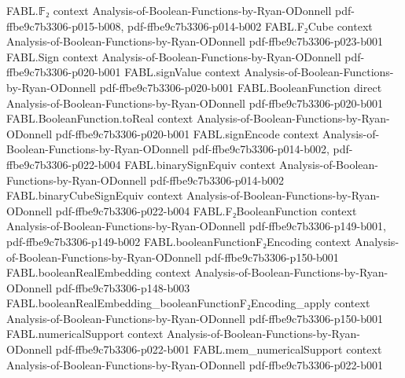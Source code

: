 \begin{theorem}
\leanok
{}
\proofstep
  {FABL.𝔽₂}
  {context}
  {Analysis-of-Boolean-Functions-by-Ryan-ODonnell}
  {pdf-ffbe9c7b3306-p015-b008,
    pdf-ffbe9c7b3306-p014-b002}
\proofstep
  {FABL.F₂Cube}
  {context}
  {Analysis-of-Boolean-Functions-by-Ryan-ODonnell}
  {pdf-ffbe9c7b3306-p023-b001}
\proofstep
  {FABL.Sign}
  {context}
  {Analysis-of-Boolean-Functions-by-Ryan-ODonnell}
  {pdf-ffbe9c7b3306-p020-b001}
\proofstep
  {FABL.signValue}
  {context}
  {Analysis-of-Boolean-Functions-by-Ryan-ODonnell}
  {pdf-ffbe9c7b3306-p020-b001}
\proofstep
  {FABL.BooleanFunction}
  {direct}
  {Analysis-of-Boolean-Functions-by-Ryan-ODonnell}
  {pdf-ffbe9c7b3306-p020-b001}
\proofstep
  {FABL.BooleanFunction.toReal}
  {context}
  {Analysis-of-Boolean-Functions-by-Ryan-ODonnell}
  {pdf-ffbe9c7b3306-p020-b001}
\proofstep
  {FABL.signEncode}
  {context}
  {Analysis-of-Boolean-Functions-by-Ryan-ODonnell}
  {pdf-ffbe9c7b3306-p014-b002,
    pdf-ffbe9c7b3306-p022-b004}
\proofstep
  {FABL.binarySignEquiv}
  {context}
  {Analysis-of-Boolean-Functions-by-Ryan-ODonnell}
  {pdf-ffbe9c7b3306-p014-b002}
\proofstep
  {FABL.binaryCubeSignEquiv}
  {context}
  {Analysis-of-Boolean-Functions-by-Ryan-ODonnell}
  {pdf-ffbe9c7b3306-p022-b004}
\proofstep
  {FABL.F₂BooleanFunction}
  {context}
  {Analysis-of-Boolean-Functions-by-Ryan-ODonnell}
  {pdf-ffbe9c7b3306-p149-b001,
    pdf-ffbe9c7b3306-p149-b002}
\proofstep
  {FABL.booleanFunctionF₂Encoding}
  {context}
  {Analysis-of-Boolean-Functions-by-Ryan-ODonnell}
  {pdf-ffbe9c7b3306-p150-b001}
\proofstep
  {FABL.booleanRealEmbedding}
  {context}
  {Analysis-of-Boolean-Functions-by-Ryan-ODonnell}
  {pdf-ffbe9c7b3306-p148-b003}
\proofstep
  {FABL.booleanRealEmbedding_booleanFunctionF₂Encoding_apply}
  {context}
  {Analysis-of-Boolean-Functions-by-Ryan-ODonnell}
  {pdf-ffbe9c7b3306-p150-b001}
\proofstep
  {FABL.numericalSupport}
  {context}
  {Analysis-of-Boolean-Functions-by-Ryan-ODonnell}
  {pdf-ffbe9c7b3306-p022-b001}
\proofstep
  {FABL.mem_numericalSupport}
  {context}
  {Analysis-of-Boolean-Functions-by-Ryan-ODonnell}
  {pdf-ffbe9c7b3306-p022-b001}
\proofstep

\end{theorem}
